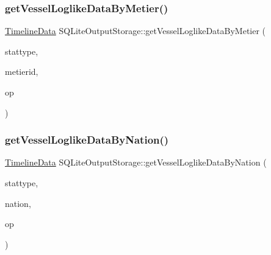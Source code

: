 \mbox{\label{class_s_q_lite_output_storage_a4f84767e2d052a7566e5c24e09d9c0d6}} 
\subsubsection{\texorpdfstring{getVesselLoglikeDataByMetier()}{getVesselLoglikeDataByMetier()}}
{\footnotesize\ttfamily \mbox{\hyperlink{struct_timeline_data}{Timeline\+Data}} S\+Q\+Lite\+Output\+Storage\+::get\+Vessel\+Loglike\+Data\+By\+Metier (\begin{DoxyParamCaption}\item[{\mbox{\hyperlink{namespacedisplace_1_1plot_a673bbc813b7f03be3dc76ae7fd087516}{displace\+::plot\+::\+Metiers\+Stat}}}]{stattype,  }\item[{int}]{metierid,  }\item[{\mbox{\hyperlink{class_s_q_lite_output_storage_aa3928d8e7ab04aafef854a63a94222eb}{Operation}}}]{op }\end{DoxyParamCaption})}

\mbox{\label{class_s_q_lite_output_storage_a18aba30ce88988bb86cb79fe20a9e0f9}} 
\subsubsection{\texorpdfstring{getVesselLoglikeDataByNation()}{getVesselLoglikeDataByNation()}}
{\footnotesize\ttfamily \mbox{\hyperlink{struct_timeline_data}{Timeline\+Data}} S\+Q\+Lite\+Output\+Storage\+::get\+Vessel\+Loglike\+Data\+By\+Nation (\begin{DoxyParamCaption}\item[{\mbox{\hyperlink{namespacedisplace_1_1plot_ab7b96ae3ae291a71823f371d77f27d98}{displace\+::plot\+::\+Nations\+Stat}}}]{stattype,  }\item[{std\+::string}]{nation,  }\item[{\mbox{\hyperlink{class_s_q_lite_output_storage_aa3928d8e7ab04aafef854a63a94222eb}{Operation}}}]{op }\end{DoxyParamCaption})}

